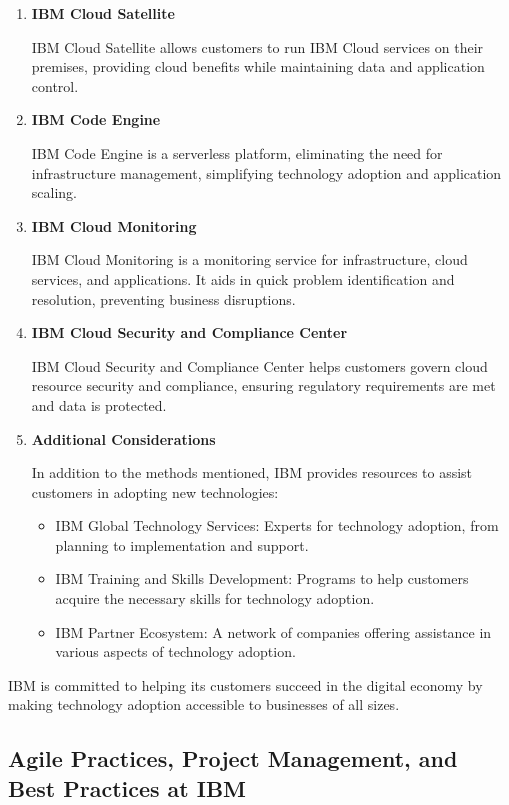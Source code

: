 \begin{enumerate}
\item \textbf{IBM Cloud Satellite}

IBM Cloud Satellite allows customers to run IBM Cloud services on their premises, providing cloud benefits while maintaining data and application control.

\item \textbf{IBM Code Engine}

IBM Code Engine is a serverless platform, eliminating the need for infrastructure management, simplifying technology adoption and application scaling.

\item \textbf{IBM Cloud Monitoring}

IBM Cloud Monitoring is a monitoring service for infrastructure, cloud services, and applications. It aids in quick problem identification and resolution, preventing business disruptions.

\item \textbf{IBM Cloud Security and Compliance Center}

IBM Cloud Security and Compliance Center helps customers govern cloud resource security and compliance, ensuring regulatory requirements are met and data is protected.

\item \textbf{Additional Considerations}

In addition to the methods mentioned, IBM provides resources to assist customers in adopting new technologies:

\begin{itemize}
    \item IBM Global Technology Services: Experts for technology adoption, from planning to implementation and support.
    \item IBM Training and Skills Development: Programs to help customers acquire the necessary skills for technology adoption.
    \item IBM Partner Ecosystem: A network of companies offering assistance in various aspects of technology adoption.
\end{itemize}
\end{enumerate}
IBM is committed to helping its customers succeed in the digital economy by making technology adoption accessible to businesses of all sizes.

\subsection{Agile Practices, Project Management, and Best Practices at IBM}
